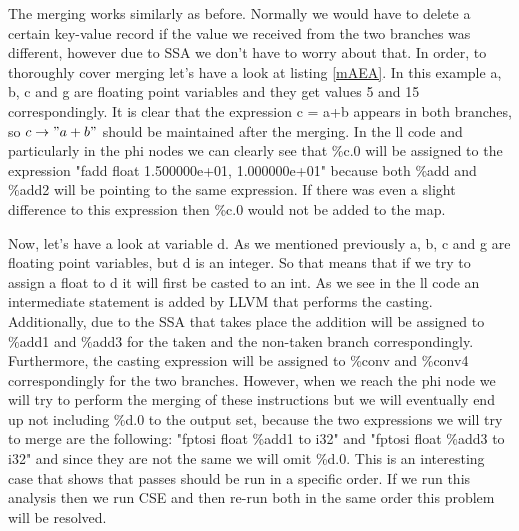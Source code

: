 The merging works similarly as before. Normally we would have to delete a certain key-value record if the value we received from the two branches was different, however due to SSA we don't have to worry about that. In order, to thoroughly cover merging let's have a look at listing \ref{mAEA}. In this example a, b, c and g are floating point variables and they get values 5 and 15 correspondingly. It is clear that the expression c = a+b appears in both branches, so $c\rightarrow"a+b"$ should be maintained after the merging. In the ll code and particularly in the phi nodes we can clearly see that \%c.0 will be assigned to the expression "fadd float 1.500000e+01, 1.000000e+01" because both \%add and \%add2 will be pointing to the same expression. If there was even a slight difference to this expression then \%c.0 would not be added to the map.


Now, let's have a look at variable d. As we mentioned previously a, b, c and g are floating point variables, but d is an integer. So that means that if we try to assign a float to d it will first be casted to an int. As we see in the ll code an intermediate statement is added by LLVM that performs the casting. Additionally, due to the SSA that takes place the addition will be assigned to \%add1 and \%add3 for the taken and the non-taken branch correspondingly. Furthermore, the casting expression will be assigned to \%conv and \%conv4 correspondingly for the two branches. However, when we reach the phi node we will try to perform the merging of these instructions but we will eventually end up not including \%d.0 to the output set, because the two expressions we will try to merge are the following: "fptosi float \%add1 to i32" and "fptosi float \%add3 to i32" and since they are not the same we will omit \%d.0. This is an interesting case that shows that passes should be run in a specific order. If we run this analysis then we run CSE and then re-run both in the same order this problem will be resolved.


